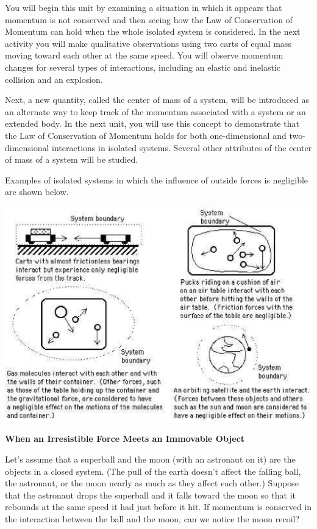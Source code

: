 You will begin this unit by examining a situation in which it appears that momentum
is not conserved and then seeing how the Law of Conservation of Momentum can
hold when the whole isolated system is considered. In the next activity you
will make qualitative observations using two carts of equal mass moving toward
each other at the same speed. You will observe momentum changes for several
types of interactions, including an elastic and inelastic collision and an explosion. 

Next, a new quantity, called the center of mass of a system, will be introduced
as an alternate way to keep track of the momentum associated with a system or
an extended body. In the next unit, you will use this concept to demonstrate
that the Law of Conservation of Momentum holds for both one-dimensional and
two-dimensional interactions in isolated systems. Several other attributes of
the center of mass of a system will be studied.

Examples of isolated systems in which the influence of outside forces is negligible
are shown below.

\vspace{0.3cm}
{\par\centering \includegraphics[width=\textwidth]{mom_cons/mom_cons_fig1.eps} \par}
\vspace{0.3cm}

\textbf{When an Irresistible Force Meets an Immovable Object }

Let's assume that a superball and the moon (with an astronaut on it) are the
objects in a closed system. (The pull of the earth doesn't affect the falling
ball, the astronaut, or the moon nearly as much as they affect each other.)
Suppose that the astronaut drops the superball and it falls toward the moon
so that it rebounds at the same speed it had just before it hit. If momentum
is conserved in the interaction between the ball and the moon, can we notice
the moon recoil? 

